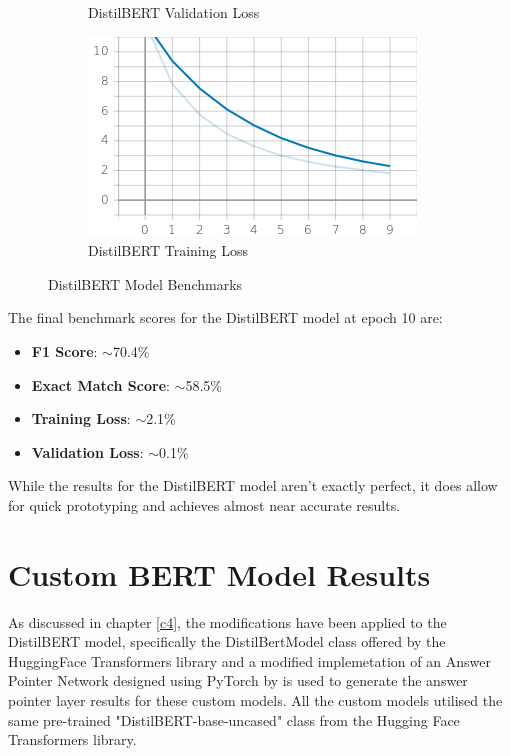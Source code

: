 \documentclass[a4paper,12pt]{report}
\begin{document}
\begin{figure}
\begin{subfigure}[b]{0.4\textwidth}
		\caption{\small DistilBERT Validation Loss}
		\label{distilbertValLoss}
	\end{subfigure}
	\hfill
	\begin{subfigure}[b]{0.4\textwidth}
		\centering
		\includegraphics[width=\textwidth]{../images/Distilbert_Train_Loss.png}
		\caption{\small DistilBERT Training Loss}
		\label{distilbertTrainloss}
	\end{subfigure}
	\caption{DistilBERT Model Benchmarks}
	\label{distilbertBenchmarks}
\end{figure}

	The final benchmark scores for the DistilBERT model at epoch 10 are:
\begin{itemize}
	\item \textbf{F1 Score}:  $\sim$70.4\%
	\item \textbf{Exact Match Score}: $\sim$58.5\%
	\item \textbf{Training Loss}:  $\sim$2.1\%
	\item \textbf{Validation Loss}: $\sim$0.1\%
\end{itemize}

While the results for the DistilBERT model aren't exactly perfect, it does allow for quick prototyping and achieves almost near accurate results.


\section{Custom BERT Model Results}\label{c52}

	As discussed in chapter \ref{c4}, the modifications have been applied to the DistilBERT model, specifically the DistilBertModel class offered by the HuggingFace Transformers library \citep{hfTransformers} and a modified implemetation of an Answer Pointer Network designed using PyTorch by \citep{pointernetGit} is used to generate the answer pointer layer results for these custom models. All the custom models utilised the same pre-trained "DistilBERT-base-uncased" class from the Hugging Face Transformers library.
\end{document}
